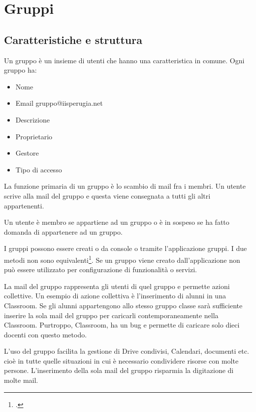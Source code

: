 \chapter{Gruppi}
\section{Caratteristiche e struttura}
Un gruppo è un insieme di utenti che hanno una caratteristica in comune.
Ogni gruppo ha:
\begin{itemize}
	\item Nome	
	\item Email gruppo@iisperugia.net
	\item Descrizione
	\item Proprietario 
	\item Gestore
	\item Tipo di accesso
\end{itemize}
La funzione primaria di un gruppo è lo scambio di mail fra i membri. Un utente scrive alla mail del gruppo e questa viene consegnata a tutti gli altri appartenenti. 

Un utente  è membro se appartiene ad un gruppo o è in sospeso se ha fatto domanda di appartenere ad un gruppo.

I gruppi possono essere creati o da console o tramite l'applicazione gruppi.
I due metodi non sono equivalenti\footcite{Google2023f}. Se un gruppo viene creato dall'applicazione non può essere utilizzato per configurazione di funzionalità o servizi.
 
La mail del gruppo rappresenta gli utenti di quel gruppo e permette azioni collettive. Un esempio di azione collettiva è l'inserimento di alunni in una Classroom. Se gli alunni appartengono allo stesso gruppo classe sarà sufficiente inserire la sola mail del gruppo per caricarli contemporaneamente nella Classroom. Purtroppo,  Classroom, ha un bug e permette di caricare solo dieci docenti con questo metodo. 

L'uso del gruppo facilita la gestione di Drive condivisi, Calendari, documenti etc. cioè in tutte quelle situazioni in cui è necessario condividere risorse con molte persone. L'inserimento della sola mail del gruppo risparmia la digitazione di molte mail.

